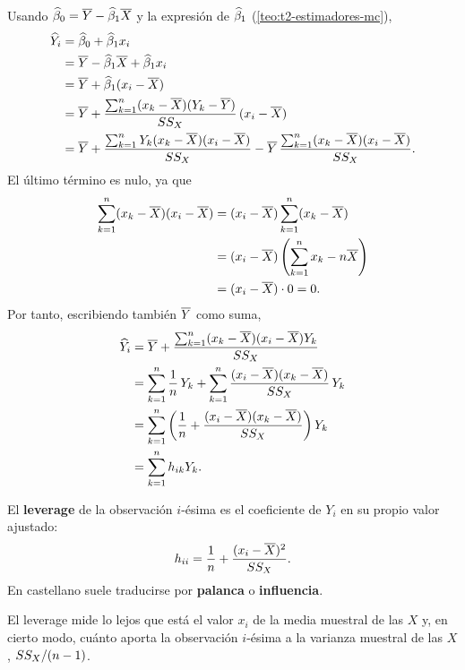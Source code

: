 \begin{demostracion}
  Usando $\widehat{\beta}_0=\overline{Y}-\widehat{\beta}_1\overline{X}$ y la expresión de $\widehat{\beta}_1$
  (\cref{teo:t2-estimadores-mc}),
  \begin{align*}
    \widehat{Y}_i &= \widehat{\beta}_0 + \widehat{\beta}_1x_i \\
    &= \overline{Y} - \widehat{\beta}_1\overline{X} + \widehat{\beta}_1x_i \\
    &= \overline{Y} + \widehat{\beta}_1(x_i-\overline{X}) \\
    &= \overline{Y} + \frac{\sum_{k=1}^{n} (x_k-\overline{X})(Y_k-\overline{Y})}{SS_X}\,(x_i-\overline{X}) \\
    &= \overline{Y} + \frac{\sum_{k=1}^{n} Y_k(x_k-\overline{X})(x_i-\overline{X})}{SS_X}
      - \overline{Y}\,\frac{\sum_{k=1}^{n} (x_k-\overline{X})(x_i-\overline{X})}{SS_X} .
  \end{align*}
  El último término es nulo, ya que
  \begin{align*}
    \sum_{k=1}^{n} (x_k-\overline{X})(x_i-\overline{X}) &= (x_i-\overline{X})\sum_{k=1}^{n} (x_k-\overline{X}) \\
    &= (x_i-\overline{X})\left(\sum_{k=1}^{n} x_k - n\overline{X}\right) \\
    &= (x_i-\overline{X})\cdot0 = 0 .
  \end{align*}
  Por tanto, escribiendo también $\overline{Y}$ como suma,
  \begin{align*}
    \widehat{Y}_i &= \overline{Y} + \frac{\sum_{k=1}^{n} (x_k-\overline{X})(x_i-\overline{X})Y_k}{SS_X} \\
    &= \sum_{k=1}^{n} \frac1n\,Y_k + \sum_{k=1}^{n} \frac{(x_i-\overline{X})(x_k-\overline{X})}{SS_X}\,Y_k \\
    &= \sum_{k=1}^{n} \left(\frac1n + \frac{(x_i-\overline{X})(x_k-\overline{X})}{SS_X}\right)Y_k \\
    &= \sum_{k=1}^{n} h_{ik}Y_k .
  \end{align*}
\end{demostracion}

\begin{definicion}
  El \textbf{leverage} de la observación $i$-ésima es el coeficiente de $Y_i$ en su propio valor
  ajustado:
  \[
    h_{ii} = \frac1n + \frac{(x_i-\overline{X})^2}{SS_X}.
  \]
  En castellano suele traducirse por \textbf{palanca} o \textbf{influencia}.
\end{definicion}

El leverage mide lo lejos que está el valor $x_i$ de la media muestral de las $X$ y, en cierto
modo, cuánto aporta la observación $i$-ésima a la varianza muestral de las $X$,
$SS_X/(n-1)$.

